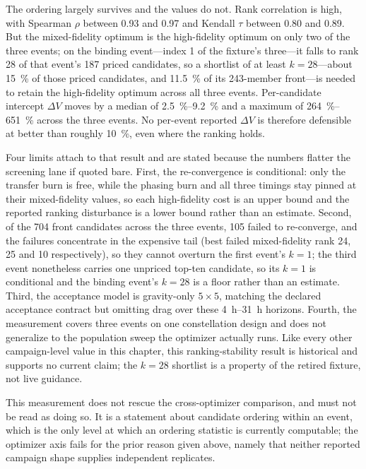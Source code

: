 The ordering largely survives and the values do not. Rank correlation is high, with Spearman \(\rho\) between \num{0.93} and \num{0.97} and Kendall \(\tau\) between \num{0.80} and \num{0.89}. But the mixed-fidelity optimum is the high-fidelity optimum on only two of the three events; on the binding event---index 1 of the fixture's three---it falls to rank 28 of that event's \num{187} priced candidates, so a shortlist of at least \(k=28\)---about \SI{15}{\percent} of those priced candidates, and \SI{11.5}{\percent} of its \num{243}-member front---is needed to retain the high-fidelity optimum across all three events. Per-candidate intercept \(\Delta V\) moves by a median of \SIrange{2.5}{9.2}{\percent} and a maximum of \SIrange{264}{651}{\percent} across the three events. No per-event reported \(\Delta V\) is therefore defensible at better than roughly \SI{10}{\percent}, even where the ranking holds.

Four limits attach to that result and are stated because the numbers flatter the screening lane if quoted bare. First, the re-convergence is conditional: only the transfer burn is free, while the phasing burn and all three timings stay pinned at their mixed-fidelity values, so each high-fidelity cost is an upper bound and the reported ranking disturbance is a lower bound rather than an estimate. Second, of the 704 front candidates across the three events, 105 failed to re-converge, and the failures concentrate in the expensive tail (best failed mixed-fidelity rank 24, 25 and 10 respectively), so they cannot overturn the first event's \(k=1\); the third event nonetheless carries one unpriced top-ten candidate, so its \(k=1\) is conditional and the binding event's \(k=28\) is a floor rather than an estimate. Third, the acceptance model is gravity-only \(5\times5\), matching the declared acceptance contract but omitting drag over these \SIrange{4}{31}{\hour} horizons. Fourth, the measurement covers three events on one constellation design and does not generalize to the population sweep the optimizer actually runs. Like every other campaign-level value in this chapter, this ranking-stability result is historical and supports no current claim; the \(k=28\) shortlist is a property of the retired fixture, not live guidance.

This measurement does not rescue the cross-optimizer comparison, and must not be read as doing so. It is a statement about candidate ordering within an event, which is the only level at which an ordering statistic is currently computable; the optimizer axis fails for the prior reason given above, namely that neither reported campaign shape supplies independent replicates.

